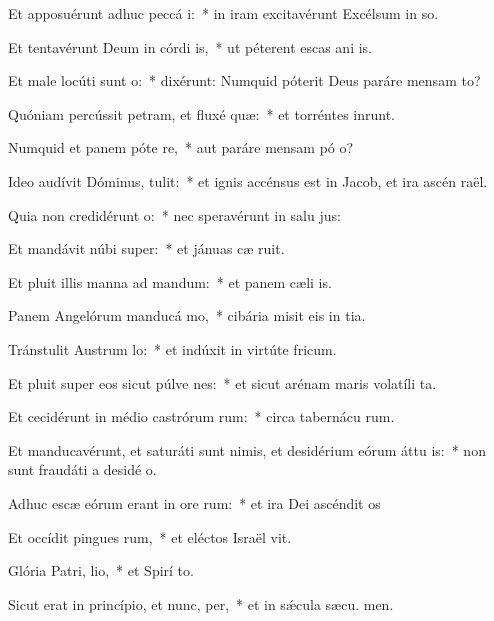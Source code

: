 \item Et apposuérunt adhuc peccá i:~* in iram excitavérunt Excélsum in so.
\item Et tentavérunt Deum in córdi is,~* ut péterent escas ani is.
\item Et male locúti sunt  o:~* dixérunt: Numquid póterit Deus paráre mensam  to?
\item Quóniam percússit petram, et fluxé quæ:~* et torréntes inrunt.
\item Numquid et panem póte re,~* aut paráre mensam pó o?
\item Ideo audívit Dóminus,  tulit:~* et ignis accénsus est in Jacob, et ira ascén  raël.
\item Quia non credidérunt  o:~* nec speravérunt in salu jus:
\item Et mandávit núbi super:~* et jánuas cæ ruit.
\item Et pluit illis manna ad mandum:~* et panem cæli  is.
\item Panem Angelórum manducá mo,~* cibária misit eis in tia.
\item Tránstulit Austrum  lo:~* et indúxit in virtúte  fricum.
\item Et pluit super eos sicut púlve nes:~* et sicut arénam maris volatíli ta.
\item Et cecidérunt in médio castrórum rum:~* circa tabernácu rum.
\item Et manducavérunt, et saturáti sunt nimis, et desidérium eórum áttu is:~* non sunt fraudáti a desidé o.
\item Adhuc escæ eórum erant in ore rum:~* et ira Dei ascéndit  os
\item Et occídit pingues rum,~* et eléctos Israël vit.
\item Glória Patri,  lio,~* et Spirí to.
\item Sicut erat in princípio, et nunc,  per,~* et in sǽcula sæcu. men.
